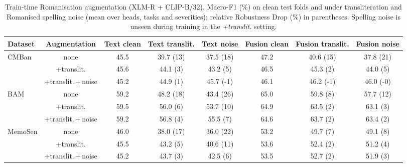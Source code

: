 \begin{table}[t]
\centering
\small
\caption{Train-time Romanisation augmentation (XLM-R + CLIP-B/32). Macro-F1 (\%) on clean test folds and under transliteration and Romanised spelling noise (mean over heads, tasks and severities); relative Robustness Drop (\%) in parentheses. Spelling noise is unseen during training in the \emph{+translit.} setting.}
\label{tab:cross_aug}
\begin{adjustbox}{max width=\textwidth}
\begin{tabular}{lccccccc}
\toprule
Dataset & Augmentation & Text clean & Text translit. & Text noise & Fusion clean & Fusion translit. & Fusion noise \\
\midrule
CMBan & none & 45.5 & 39.7 (13) & 37.5 (18) & 47.2 & 40.6 (15) & 37.8 (21) \\
 & +translit. & 45.6 & 44.1 (3) & 43.2 (5) & 46.5 & 45.3 (2) & 44.0 (5) \\
 & +translit.\,+\,noise & 45.2 & 44.9 (1) & 45.7 (-1) & 46.1 & 46.2 (-1) & 46.0 (-0) \\
BAM & none & 59.2 & 48.2 (18) & 43.4 (26) & 65.0 & 59.8 (8) & 57.7 (12) \\
 & +translit. & 59.5 & 56.0 (6) & 53.7 (10) & 64.9 & 63.5 (2) & 63.1 (3) \\
 & +translit.\,+\,noise & 59.2 & 56.8 (4) & 55.5 (7) & 64.6 & 63.7 (2) & 63.4 (2) \\
MemoSen & none & 46.0 & 38.0 (17) & 36.0 (22) & 53.2 & 49.7 (7) & 49.1 (8) \\
 & +translit. & 45.5 & 43.2 (5) & 40.6 (11) & 53.6 & 52.4 (2) & 51.2 (4) \\
 & +translit.\,+\,noise & 45.2 & 43.7 (3) & 42.5 (6) & 53.5 & 52.7 (2) & 51.9 (3) \\
\bottomrule
\end{tabular}
\end{adjustbox}
\end{table}
